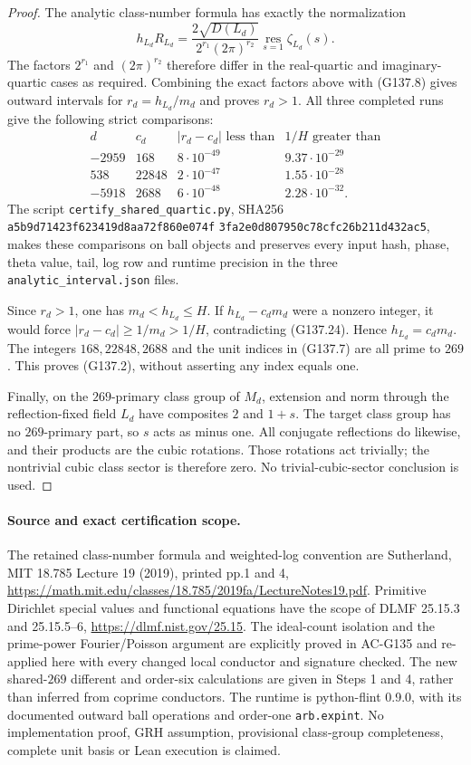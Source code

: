 \begin{proof}
The analytic class-number formula has exactly the normalization
\[
 h_{L_d}R_{L_d}
   =\frac{2\sqrt{D(L_d)}}{2^{r_1}(2\pi)^{r_2}}
                \operatorname*{res}_{s=1}\zeta_{L_d}(s).
 \tag{G137.23}
\]
The factors $2^{r_1}$ and $(2\pi)^{r_2}$ therefore differ in
the real-quartic and imaginary-quartic cases as required.
Combining the exact factors above with (G137.8) gives outward
intervals for $r_d=h_{L_d}/m_d$ and proves $r_d>1$.
All three completed runs give the following strict comparisons:
\[
\begin{array}{c|r|c|c}
d&c_d&|r_d-c_d|\text{ less than}&1/H\text{ greater than}\\\hline
-2959&168&8\cdot10^{-49}&9.37\cdot10^{-29}\\
538&22848&2\cdot10^{-47}&1.55\cdot10^{-28}\\
-5918&2688&6\cdot10^{-48}&2.28\cdot10^{-32}.
\end{array}
\tag{G137.24}
\]
The script \texttt{certify\_shared\_quartic.py}, SHA256
\texttt{a5b9d71423f623419d8aa72f860e074f}\allowbreak
\texttt{3fa2e0d807950c78cfc26b211d432ac5},
makes these comparisons on ball objects and preserves every
input hash, phase, theta value, tail, log row and runtime precision
in the three \texttt{analytic\_interval.json} files.

Since $r_d>1$, one has $m_d<h_{L_d}\le H$.
If $h_{L_d}-c_dm_d$ were a nonzero integer, it would force
$|r_d-c_d|\ge1/m_d>1/H$, contradicting (G137.24).
Hence $h_{L_d}=c_dm_d$.  The integers $168,22848,2688$ and
the unit indices in (G137.7) are all prime to $269$.
This proves (G137.2), without asserting any index equals one.

Finally, on the $269$-primary class group of $M_d$, extension
and norm through the reflection-fixed field $L_d$ have
composites $2$ and $1+s$.
The target class group has no $269$-primary part, so $s$ acts
as minus one.  All conjugate reflections do likewise, and
their products are the cubic rotations.  Those rotations act
trivially; the nontrivial cubic class sector is therefore zero.
No trivial-cubic-sector conclusion is used.
\end{proof}

\paragraph{Source and exact certification scope.}
The retained class-number formula and weighted-log convention
are Sutherland, MIT 18.785 Lecture 19 (2019), printed pp.1 and 4,
\url{https://math.mit.edu/classes/18.785/2019fa/LectureNotes19.pdf}.
Primitive Dirichlet special values and functional equations have
the scope of DLMF 25.15.3 and 25.15.5--6,
\url{https://dlmf.nist.gov/25.15}.
The ideal-count isolation and the prime-power Fourier/Poisson
argument are explicitly proved in AC-G135 and re-applied here
with every changed local conductor and signature checked.
The new shared-$269$ different and order-six calculations are
given in Steps 1 and 4, rather than inferred from coprime conductors.
The runtime is python-flint 0.9.0, with its documented outward
ball operations and order-one \texttt{arb.expint}.
No implementation proof, GRH assumption, provisional class-group
completeness, complete unit basis or Lean execution is claimed.

